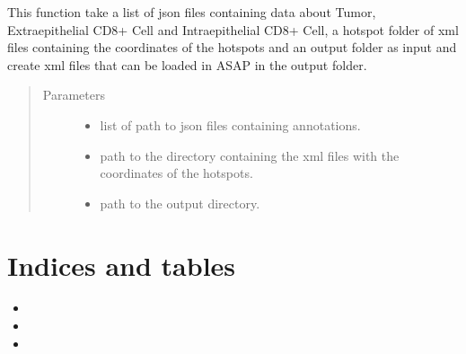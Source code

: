 \documentclass[letterpaper,10pt,english]{sphinxmanual}
\begin{document}
\begin{fulllineitems}
\label{\detokenize{json_to_xml:json_to_xml.convert_json_to_xml}}
\sphinxAtStartPar
This function take a list of json files containing data about Tumor, Extraepithelial CD8+ Cell and
Intraepithelial CD8+ Cell, a hotspot folder of xml files containing the coordinates of the hotspots
and an output folder as input and create xml files that can be loaded in ASAP in the output folder.
\begin{quote}\begin{description}
\item[{Parameters}] \leavevmode\begin{itemize}
\item {} 
\sphinxAtStartPar
{} \textendash{} list of path to json files containing annotations.

\item {} 
\sphinxAtStartPar
{} \textendash{} path to the directory containing the xml files with the coordinates of the hotspots.

\item {} 
\sphinxAtStartPar
{} \textendash{} path to the output directory.

\end{itemize}

\end{description}\end{quote}

\end{fulllineitems}



\chapter{Indices and tables}
\label{\detokenize{index:indices-and-tables}}\begin{itemize}
\item {} 
\sphinxAtStartPar
{}

\item {} 
\sphinxAtStartPar
{}

\item {} 
\sphinxAtStartPar
{}

\end{itemize}
\end{document}
